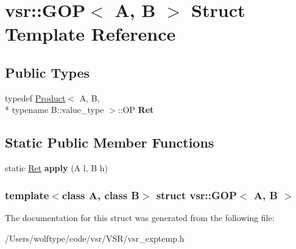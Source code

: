 \hypertarget{structvsr_1_1_g_o_p}{\section{vsr\-:\-:G\-O\-P$<$ A, B $>$ Struct Template Reference}
\label{structvsr_1_1_g_o_p}
}
\subsection*{Public Types}
\begin{DoxyCompactItemize}
\item 
\hypertarget{structvsr_1_1_g_o_p_a495ee53e841bc1c74504b8caec836a0e}{typedef \hyperlink{structvsr_1_1_product}{Product}$<$ A, B, \\*
typename B\-::value\-\_\-type $>$\-::O\-P {\bfseries Ret}}\label{structvsr_1_1_g_o_p_a495ee53e841bc1c74504b8caec836a0e}

\end{DoxyCompactItemize}
\subsection*{Static Public Member Functions}
\begin{DoxyCompactItemize}
\item 
\hypertarget{structvsr_1_1_g_o_p_a892c2f01fddb2e23a24cf42f30794180}{static \hyperlink{classvsr_1_1_m_v}{Ret} {\bfseries apply} (A l, B h)}\label{structvsr_1_1_g_o_p_a892c2f01fddb2e23a24cf42f30794180}

\end{DoxyCompactItemize}
\subsubsection*{template$<$class A, class B$>$ struct vsr\-::\-G\-O\-P$<$ A, B $>$}



The documentation for this struct was generated from the following file\-:\begin{DoxyCompactItemize}
\item 
/\-Users/wolftype/code/vsr/\-V\-S\-R/vsr\-\_\-exptemp.\-h\end{DoxyCompactItemize}
